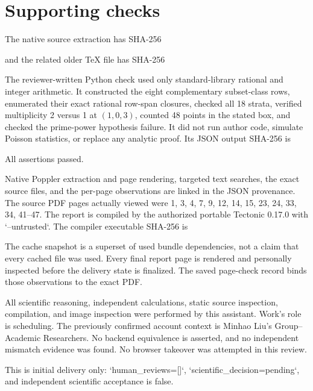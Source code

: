 \documentclass[10pt]{article}
\begin{document}
\section*{Supporting checks}
The native source extraction has SHA-256\par
and the related older TeX file has SHA-256\par
The reviewer-written Python check used only standard-library rational and integer arithmetic. It constructed the eight complementary subset-class rows, enumerated their exact rational row-span closures, checked all 18 strata, verified multiplicity 2 versus 1 at \((1,0,3)\), counted 48 points in the stated box, and checked the prime-power hypothesis failure. It did not run author code, simulate Poisson statistics, or replace any analytic proof. Its JSON output SHA-256 is\par
All assertions passed.\par
Native Poppler extraction and page rendering, targeted text searches, the exact source files, and the per-page observations are linked in the JSON provenance. The source PDF pages actually viewed were 1, 3, 4, 7, 9, 12, 14, 15, 23, 24, 33, 34, 41–47. The report is compiled by the authorized portable Tectonic 0.17.0 with `–untrusted`. The compiler executable SHA-256 is\par
The cache snapshot is a superset of used bundle dependencies, not a claim that every cached file was used. Every final report page is rendered and personally inspected before the delivery state is finalized. The saved page-check record binds those observations to the exact PDF.\par
All scientific reasoning, independent calculations, static source inspection, compilation, and image inspection were performed by this assistant. Work’s role is scheduling. The previously confirmed account context is Minhao Liu’s Group–Academic Researchers. No backend equivalence is asserted, and no independent mismatch evidence was found. No browser takeover was attempted in this review.\par
This is initial delivery only: `human\_reviews=[]`, `scientific\_decision=pending`, and independent scientific acceptance is false.\par
\end{document}
